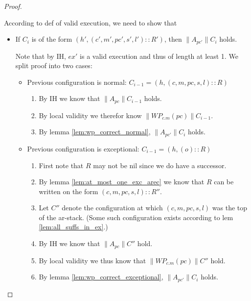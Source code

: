 \documentclass[a4paper,11pt]{article}
\newcommand{\pc}{\mathit{pc}}
\newcommand{\ex}{\mathit{ex}}
\newcommand{\WP}{\mathit{WP}}
\begin{document}
{\begin{proof}
\begin{enumerate}
\begin{description}
    According to def of valid execution, we need to show that
    \begin{itemize} 
      \item If $C_i$ is of the form $(h', (c', m', \pc', s', l')::R')$, then $\| A_{\pc'} \| C_i$ holds.
      
      Note that by IH, $\ex'$ is a valid execution and thus of length at least 1. We split proof into two cases:
      \begin{itemize}
      \item Previous configuration is normal: $C_{i-1} = (h, (c, m, \pc, s, l)::R)$

        \begin{enumerate}
          \item By IH we know that $\| A_{\pc} \| C_{i-1}$ holds.
          \item By local validity we therefor know $\| \WP_{c.m}(\pc) \|C_{i-1}$.
          \item By lemma \ref{lem:wp_correct_normal}, $\| A_{\pc'} \| C_i$ holds.
        \end{enumerate}
        
      \item Previous configuration is exceptional: $C_{i-1} = (h, (o)::R)$
        
        \begin{enumerate}
          \item First note that $R$ may not be nil since we do have a successor.
          \item By lemma \ref{lem:at_most_one_exc_arec} we know that $R$ can be written on the form $(c, m, \pc, s, l)::R''$.
          \item Let $C''$ denote the configuration at which $(c, m, \pc, s, l)$ was the top of the ar-stack. (Some such configuration exists according to lem \ref{lem:all_suffs_in_ex}.)
          \item By IH we know that $\| A_{\pc} \| C''$ hold.
          \item By local validity we thus know that $\| \WP_{c.m}(\pc) \| C''$ hold.
          \item By lemma \ref{lem:wp_correct_exceptional}, $\| A_{\pc'} \| C_i$ holds.
        \end{enumerate}
        
      \end{itemize}
      

\end{itemize}
\end{description}
\end{enumerate}
\end{proof}}
\end{document}

